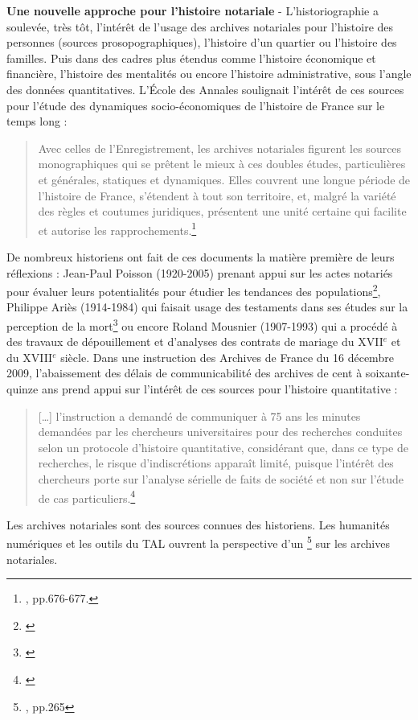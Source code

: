\textbf{Une nouvelle approche pour l'histoire notariale} - L'historiographie a soulevée, très tôt, l'intérêt de l'usage des archives notariales pour l'histoire des personnes (sources prosopographiques), l'histoire d'un quartier ou l'histoire des familles. Puis dans des cadres plus étendus comme l'histoire économique et financière, l'histoire des mentalités ou encore l'histoire administrative, sous l'angle des données quantitatives. 
L'École des Annales soulignait l'intérêt de ces sources pour l'étude des dynamiques socio-économiques de l'histoire de France sur le temps long : 
\begin{quote}
    Avec celles de l'Enregistrement, les archives notariales figurent les sources monographiques qui se prêtent le mieux à ces doubles études, particulières et générales, statiques et dynamiques. Elles couvrent une longue période de l'histoire de France, s'étendent à tout son territoire, et, malgré la variété des règles et coutumes juridiques, présentent une unité certaine qui facilite et autorise les rapprochements.\footnote{\cite{daumard_methodes_1959}, pp.676-677.}
\end{quote}
De nombreux historiens ont fait de ces documents la matière première de leurs réflexions : Jean-Paul Poisson (1920-2005) prenant appui sur les actes notariés pour évaluer leurs potentialités pour étudier les tendances des populations\footnote{\cite{poisson_histoire_1974}}, Philippe Ariès (1914-1984) qui faisait usage des testaments dans ses études sur la perception de la mort\footnote{\cite{girard_aries_1978}} ou encore Roland Mousnier (1907-1993) qui a procédé à des travaux de dépouillement et d'analyses des contrats de mariage du XVII$^{e}$ et du XVIII$^{e}$ siècle. Dans une instruction des Archives de France du 16 décembre 2009, l'abaissement des délais de communicabilité des archives de cent à soixante-quinze ans prend appui sur l'intérêt de ces sources pour l'histoire quantitative : 
\begin{quote}
    [\ldots] l'instruction a demandé de communiquer à 75 ans les minutes demandées par les chercheurs universitaires pour des recherches conduites selon un protocole d'histoire quantitative, considérant que, dans ce type de recherches, le risque d'indiscrétions apparaît limité, puisque l'intérêt des chercheurs porte sur l'analyse sérielle de faits de société et non sur l'étude de cas particuliers.\footnote{\cite{limon-bonnet_les_2013}}
\end{quote}
Les archives notariales sont des sources connues des historiens. Les humanités numériques et les outils du TAL ouvrent la perspective d'un \footnote{\cite{limon-bonnet_innovation_2019}, pp.265} sur les archives notariales. 
\\

